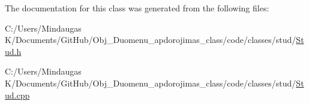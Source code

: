 The documentation for this class was generated from the following files\+:\begin{DoxyCompactItemize}
\item 
C\+:/\+Users/\+Mindaugas K/\+Documents/\+Git\+Hub/\+Obj\+\_\+\+Duomenu\+\_\+apdorojimas\+\_\+class/code/classes/stud/\mbox{\hyperlink{code_2classes_2stud_2_stud_8h}{Stud.\+h}}\item 
C\+:/\+Users/\+Mindaugas K/\+Documents/\+Git\+Hub/\+Obj\+\_\+\+Duomenu\+\_\+apdorojimas\+\_\+class/code/classes/stud/\mbox{\hyperlink{code_2classes_2stud_2_stud_8cpp}{Stud.\+cpp}}\end{DoxyCompactItemize}
